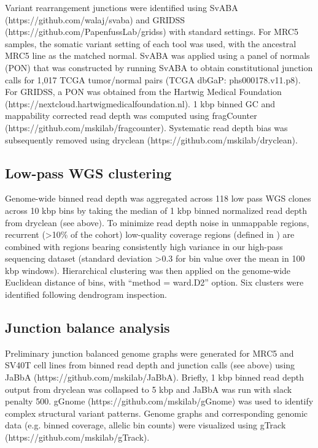 \documentclass[phd,tocprelim]{cornell}
\begin{document}
Variant rearrangement junctions were identified using SvABA (https://github.com/walaj/svaba) and GRIDSS (https://github.com/PapenfussLab/gridss) with standard settings. For MRC5 samples, the somatic variant setting of each tool was used, with the ancestral MRC5 line as the matched normal.  SvABA was applied using a panel of normals (PON) that was constructed by running SvABA to obtain constitutional junction calls for 1,017 TCGA tumor/normal pairs (TCGA dbGaP: phs000178.v11.p8).  For GRIDSS, a PON was obtained from the Hartwig Medical Foundation (https://nextcloud.hartwigmedicalfoundation.nl). 1 kbp binned GC and mappability corrected read depth was computed using fragCounter (https://github.com/mskilab/fragcounter). Systematic read depth bias was subsequently removed using dryclean (https://github.com/mskilab/dryclean).

\subsection*{Low-pass WGS clustering}
Genome-wide binned read depth was aggregated across 118 low pass WGS clones across 10 kbp bins by taking the median of 1 kbp binned normalized read depth from dryclean (see above). To minimize read depth noise in unmappable regions, recurrent (>10\% of the cohort) low-quality coverage regions (defined in \cite{Hadi2020-um}) are combined with regions bearing consistently high variance in our high-pass sequencing dataset (standard deviation >0.3 for bin value over the mean in 100 kbp windows). Hierarchical clustering was then applied on the genome-wide Euclidean distance of bins, with “method = ward.D2” option. Six clusters were identified following dendrogram inspection.  

\subsection*{Junction balance analysis}
Preliminary junction balanced genome graphs were generated for MRC5 and SV40T cell lines from binned read depth and junction calls (see above) using JaBbA (https://github.com/mskilab/JaBbA)\cite{Hadi2020-um}. Briefly, 1 kbp binned read depth output from dryclean was collapsed to 5 kbp and JaBbA was run with slack penalty 500. gGnome (https://github.com/mskilab/gGnome) was used to identify complex structural variant patterns. Genome graphs and corresponding genomic data (e.g. binned coverage, allelic bin counts) were visualized using gTrack (https://github.com/mskilab/gTrack). 
\end{document}
